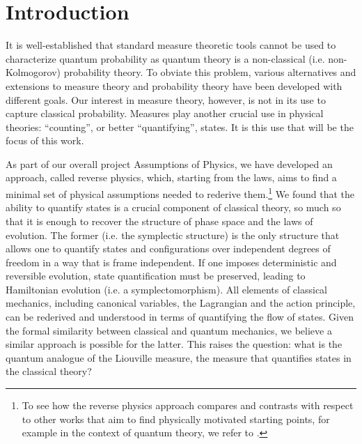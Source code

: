 \documentclass[entropy,article,submit,pdftex,moreauthors]{Definitions/mdpi}
\begin{document}

\section{Introduction}

It is well-established that standard measure theoretic tools cannot be used to characterize quantum probability as quantum theory is a non-classical (i.e. non-Kolmogorov) probability theory. To obviate this problem, various alternatives and extensions to measure theory and probability theory have been developed with different goals.\cite{groenewold1946principles, moyal1949quantum, gleason1957measures, sorkin1994quantum, hamhalter2003quantum, gudder2009quantum, svozil2022extending, monchietti2023measure} Our interest in measure theory, however, is not in its use to capture classical probability. Measures play another crucial use in physical theories: ``counting'', or better ``quantifying'', states. It is this use that will be the focus of this work.

As part of our overall project Assumptions of Physics,\cite{aop-book} we have developed an approach, called reverse physics,\cite{aop-phys-ReversePhysics} which, starting from the laws, aims to find a minimal set of physical assumptions needed to rederive them.\footnote{To see how the reverse physics approach compares and contrasts with respect to other works that aim to find physically motivated starting points, for example in the context of quantum theory,\cite{zeilinger1999,Hardy:2001jk,clifton2003,bub2005,chiribella2011} we refer to \cite{aop-phys-ReversePhysics}.} We found that the ability to quantify states is a crucial component of classical theory, so much so that it is enough to recover the structure of phase space and the laws of evolution.\cite{aop-phil-Hamiltonianinformation,aop-phil-HamiltonianPrivilege} The former (i.e. the symplectic structure) is the only structure that allows one to quantify states and configurations over independent degrees of freedom in a way that is frame independent. If one imposes deterministic and reversible evolution, state quantification must be preserved, leading to Hamiltonian evolution (i.e. a symplectomorphism). All elements of classical mechanics, including canonical variables, the Lagrangian and the action principle, \cite{aop-phys-ActionPrincipleInterpretation} can be rederived and understood in terms of quantifying the flow of states. Given the formal similarity between classical and quantum mechanics, we believe a similar approach is possible for the latter. This raises the question: what is the quantum analogue of the Liouville measure, the measure that quantifies states in the classical theory?
\end{document}
